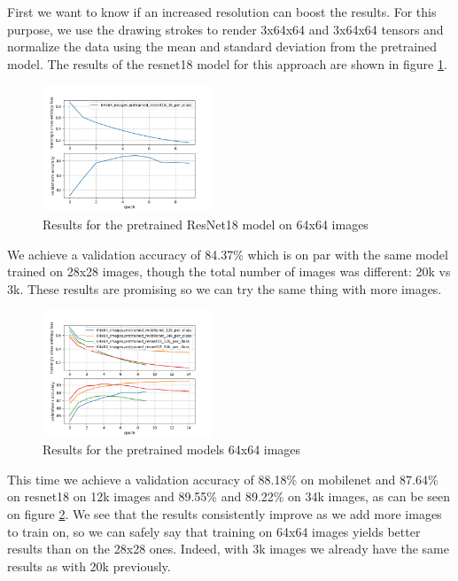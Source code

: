 \documentclass[10pt,twocolumn,letterpaper]{article}
\begin{document}
First we want to know if an increased resolution can boost the results. For this purpose, we use the drawing strokes to render 3x64x64 and 3x64x64 tensors and normalize the data using the mean and standard deviation from the pretrained model. The results of the resnet18 model for this approach are shown in figure \ref{fig:resnet_64_3k}.


\begin{figure}[h] 
\centering
\includegraphics[width=0.45\textwidth]{images/imgen_resnet18_3k.png}
\caption{Results for the pretrained ResNet18 model on 64x64 images}
\label{fig:resnet_64_3k}
\end{figure}


We achieve a validation accuracy of 84.37\% which is on par with the same model trained on 28x28 images, though the total number of images was different: 20k vs 3k. These results are promising so we can try the same thing with more images.

\begin{figure}[h] 
\centering
\includegraphics[width=0.45\textwidth]{images/imgen_64.png}
\caption{Results for the pretrained models 64x64 images}
\label{fig:imgen_64}
\end{figure}

This time we achieve a validation accuracy of 88.18\% on mobilenet and 87.64\% on resnet18 on 12k images and 89.55\% and 89.22\% on 34k images, as can be seen on figure \ref{fig:imgen_64}. We see that the results consistently improve as we add more images to train on, so we can safely say that training on 64x64 images yields better results than on the 28x28 ones. Indeed, with 3k images we already have the same results as with 20k previously.
\end{document}
